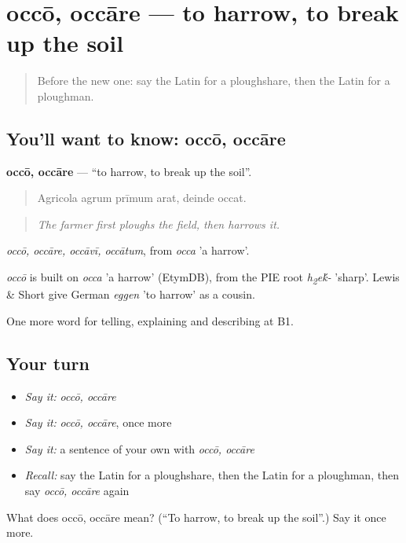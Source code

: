 \section[occō, occāre]{occō, occāre — to harrow, to break up the soil}

\label{lesson:LA-C474-occo}



\begin{quote}
Before the new one: say the Latin for a ploughshare, then the Latin for a ploughman.
\end{quote}

\subsection*{You'll want to know: occō, occāre}
\textbf{occō, occāre} — \textquotedblleft{}to harrow, to break up the soil\textquotedblright{}.

\begin{quote}
Agricola agrum prīmum arat, deinde occat.
\end{quote}

\begin{quote}
\emph{The farmer first ploughs the field, then harrows it.}
\end{quote}

\emph{occō, occāre, occāvī, occātum}, from \emph{occa} 'a harrow'.

\begin{cousinweb}
\emph{occō} is built on \emph{occa} 'a harrow' (EtymDB), from the PIE root \emph{h\textsubscript{2}e\'{k}-} 'sharp'. Lewis \& Short give German \emph{eggen} 'to harrow' as a cousin.
\end{cousinweb}

\begin{grammarlens}[title={What you've built}]
One more word for telling, explaining and describing at B1.
\end{grammarlens}

\subsection*{Your turn}
\begin{itemize}
\raggedright
  \item \emph{Say it:} \emph{occō, occāre}
  \item \emph{Say it:} \emph{occō, occāre}, once more
  \item \emph{Say it:} a sentence of your own with \emph{occō, occāre}
  \item \emph{Recall:} say the Latin for a ploughshare, then the Latin for a ploughman, then say \emph{occō, occāre} again
\end{itemize}

\begin{tcolorbox}[breakable,colback=teal!4,colframe=teal!35!black,title={Before you move on}]
What does occō, occāre mean? (\textquotedblleft{}To harrow, to break up the soil\textquotedblright{}.) Say it once more.
\end{tcolorbox}
